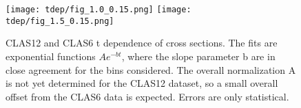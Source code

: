 \begin{figure}[hbt]
	\centering
	\texttt{[image: tdep/fig\_1.0\_0.15.png]}
	\texttt{[image: tdep/fig\_1.5\_0.15.png]}

	\caption{CLAS12 and CLAS6 t dependence of cross sections. The fits are exponential functions $Ae^{-bt}$, where the slope parameter b are in close agreement for the bins considered. The overall normalization A is not yet determined for the CLAS12 dataset, so a small overall offset from the CLAS6 data is expected. Errors are only statistical.}
	\label{fig:tdep}
\end{figure}
